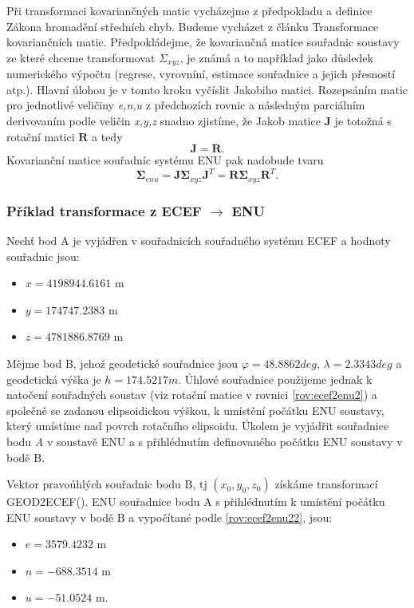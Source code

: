 Při transformaci kovariančných matic vycházejme z předpokladu a definice Zákona hromadění středních chyb. Budeme vycházet z článku Transformace kovariančních matic. Předpokládejme, že kovariančná matice souřadnic soustavy ze které chceme transformovat $\Sigma_{xyz}$, je známá a to například jako důsledek numerického výpočtu (regrese, vyrovníní, estimace souřadnice a jejich přesností atp.). Hlavní úlohou je v tomto kroku vyčíslit Jakobiho matici. Rozepsáním matic pro jednotlivé veličiny \textit{e,n,u} z předchozích rovnic a následným parciálním derivovaním podle veličin \textit{x,y,z} snadno zjistíme, že Jakob matice $\mathbf{J}$ je totožná s rotační matici $\mathbf{R}$ a tedy
\begin{equation}
\mathbf{J} = \mathbf{R}.
\end{equation}
Kovarianční matice souřadníc systému ENU pak nadobude tvaru
\begin{equation}
\mathbf{\Sigma}_{enu} = \mathbf{J}\mathbf{\Sigma}_{xyz}\mathbf{J}^{T} = \mathbf{R}\mathbf{\Sigma}_{xyz}\mathbf{R}^{T}.
\end{equation}

\subsubsection{Příklad transformace z ECEF $\rightarrow$ ENU}

Nechť bod A je vyjádřen v souřadnicích souřadného systému ECEF a hodnoty souřadnic jsou:
\begin{itemize}
\item $x = 4198944.6161$ m
\item $y = 174747.2383$ m
\item $z = 4781886.8769$ m
\end{itemize}

Mějme bod B, jehož geodetické souřadnice jsou $ \varphi = 48.8862 deg$, $\lambda = 2.3343 deg$ a geodetická výška je $ h = 174.5217 m $. Úhlové souřadnice použijeme jednak k natočení souřadných soustav (viz rotační matice v rovnici \ref{rov:ecef2enu2}) a společně se zadanou elipsoidickou výškou, k umístění počátku ENU soustavy, který umístíme nad povrch rotačního elipsoidu. Úkolem je vyjádřit souřadnice bodu \textit{A} v soustavě ENU a s přihlédnutím definovaného počátku ENU soustavy v bodě B.

Vektor pravoúhlých souřadnic bodu B, tj $ \left(x_{0}, y_{0}, z_{0} \right)$ získáme transformací GEOD2ECEF(). ENU souřadnice bodu A s přihlédnutím k umístění počátku ENU soustavy v bodě B a vypočítané podle \ref{rov:ecef2enu22}, jsou:
\begin{itemize}
\item $e = 3579.4232 $ m
\item $n = -688.3514 $ m
\item $u = -51.0524 $ m.
\end{itemize}

